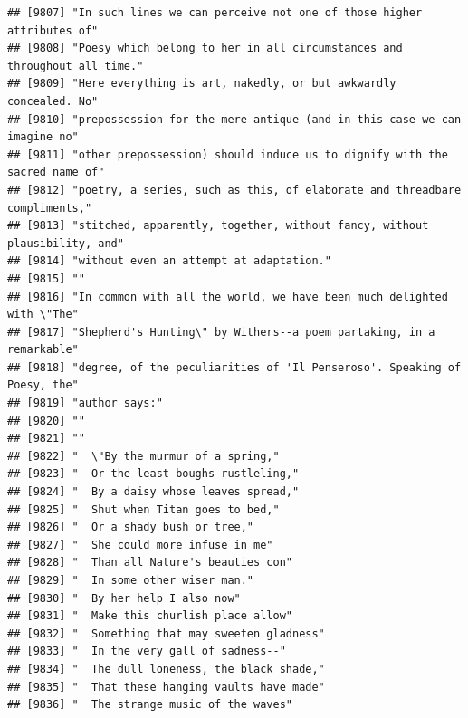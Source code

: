\documentclass{article}\usepackage[]{graphicx}\usepackage[]{color}
\makeatletter
\newenvironment{kframe}{%
 \def\at@end@of@kframe{}%
 \ifinner\ifhmode%
  \def\at@end@of@kframe{\end{minipage}}%
  \begin{minipage}{\columnwidth}%
 \fi\fi%
 \def\FrameCommand##1{\hskip\@totalleftmargin \hskip-\fboxsep
 \colorbox{shadecolor}{##1}\hskip-\fboxsep
     \hskip-\linewidth \hskip-\@totalleftmargin \hskip\columnwidth}%
 \MakeFramed {\advance\hsize-\width
   \@totalleftmargin\z@ \linewidth\hsize
   \@setminipage}}%
 {\par\unskip\endMakeFramed%
 \at@end@of@kframe}
\newenvironment{knitrout}{}{} %
\makeatother
\begin{document}
\begin{knitrout}
\begin{kframe}
\begin{verbatim}
## [9807] "In such lines we can perceive not one of those higher attributes of"         
## [9808] "Poesy which belong to her in all circumstances and throughout all time."     
## [9809] "Here everything is art, nakedly, or but awkwardly concealed. No"             
## [9810] "prepossession for the mere antique (and in this case we can imagine no"      
## [9811] "other prepossession) should induce us to dignify with the sacred name of"    
## [9812] "poetry, a series, such as this, of elaborate and threadbare compliments,"    
## [9813] "stitched, apparently, together, without fancy, without plausibility, and"    
## [9814] "without even an attempt at adaptation."                                      
## [9815] ""                                                                            
## [9816] "In common with all the world, we have been much delighted with \"The"        
## [9817] "Shepherd's Hunting\" by Withers--a poem partaking, in a remarkable"          
## [9818] "degree, of the peculiarities of 'Il Penseroso'. Speaking of Poesy, the"      
## [9819] "author says:"                                                                
## [9820] ""                                                                            
## [9821] ""                                                                            
## [9822] "  \"By the murmur of a spring,"                                              
## [9823] "  Or the least boughs rustleling,"                                           
## [9824] "  By a daisy whose leaves spread,"                                           
## [9825] "  Shut when Titan goes to bed,"                                              
## [9826] "  Or a shady bush or tree,"                                                  
## [9827] "  She could more infuse in me"                                               
## [9828] "  Than all Nature's beauties con"                                            
## [9829] "  In some other wiser man."                                                  
## [9830] "  By her help I also now"                                                    
## [9831] "  Make this churlish place allow"                                            
## [9832] "  Something that may sweeten gladness"                                       
## [9833] "  In the very gall of sadness--"                                             
## [9834] "  The dull loneness, the black shade,"                                       
## [9835] "  That these hanging vaults have made"                                       
## [9836] "  The strange music of the waves"                                            

\end{verbatim}
\end{kframe}
\end{knitrout}
\end{document}
